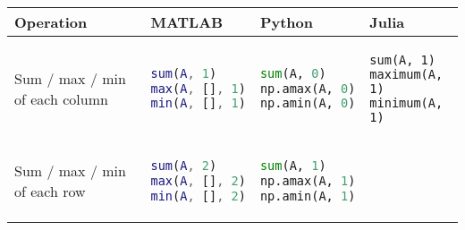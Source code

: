 \documentclass[10pt, landscape]{article}
\begin{document}
\begin{multicols}{2}
\begin{tabular}[]{@{}llll@{}}
\toprule
\begin{minipage}[b]{0.23\columnwidth}\raggedright
Operation
\end{minipage} & \begin{minipage}[b]{0.22\columnwidth}\raggedright
MATLAB
\end{minipage} & \begin{minipage}[b]{0.24\columnwidth}\raggedright
Python
\end{minipage} & \begin{minipage}[b]{0.20\columnwidth}\raggedright
Julia
\end{minipage}\tabularnewline
\midrule
\begin{minipage}[t]{0.23\columnwidth}\raggedright
Sum / max / min of each column
\end{minipage} & \begin{minipage}[t]{0.22\columnwidth}\raggedright
\begin{lstlisting}[language=Matlab]
sum(A, 1)
max(A, [], 1)
min(A, [], 1)
\end{lstlisting}

\end{minipage} & \begin{minipage}[t]{0.24\columnwidth}\raggedright
\begin{lstlisting}[language=Python]
sum(A, 0)
np.amax(A, 0)
np.amin(A, 0)
\end{lstlisting}

\end{minipage} & \begin{minipage}[t]{0.20\columnwidth}\raggedright
\begin{lstlisting}
sum(A, 1)
maximum(A, 1)
minimum(A, 1)
\end{lstlisting}

\end{minipage}\tabularnewline
\begin{minipage}[t]{0.23\columnwidth}\raggedright
Sum / max / min of each row
\end{minipage} & \begin{minipage}[t]{0.22\columnwidth}\raggedright
\begin{lstlisting}[language=Matlab]
sum(A, 2)
max(A, [], 2)
min(A, [], 2)
\end{lstlisting}

\end{minipage} & \begin{minipage}[t]{0.24\columnwidth}\raggedright
\begin{lstlisting}[language=Python]
sum(A, 1)
np.amax(A, 1)
np.amin(A, 1)
\end{lstlisting}


\end{minipage}
\end{tabular}
\end{multicols}
\end{document}
